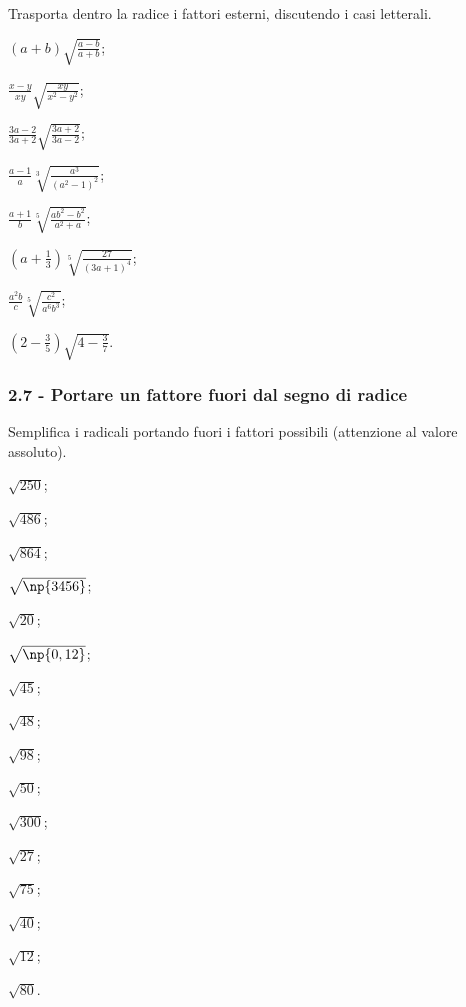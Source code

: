 \begin{esercizio}[\Ast]
 \label{ese:2.51}
Trasporta dentro la radice i fattori esterni, discutendo i casi letterali.
 \begin{multicols}{3}
 \begin{enumeratea}
 \item $(a+b)\sqrt{\frac{a-b}{a+b}}$;
 \item $\frac{x-y}{xy}\sqrt{\frac{xy}{x^2-y^2}}$;
 \item $\frac{3a-2}{3a+2}\sqrt{\frac{3a+2}{3a-2}}$;
 \item $\frac{a-1}{a}\sqrt[3]{\frac{a^3}{(a^2-1)^2}}$;
 \item $\frac{a+1}{b}\sqrt[5]{\frac{ab^2-b^2}{a^2+a}}$;
 \item $\left(a+\frac{1}{3}\right)\sqrt[5]{\frac{27}{(3a+1)^4}}$;
 \item $\frac{a^2b}{c}\sqrt[5]{\frac{c^2}{a^6b^3}}$;
 \item $\left(2-\frac{3}{5}\right)\sqrt{4-\frac{3}{7}}$.
 \end{enumeratea}
 \end{multicols}
\end{esercizio}

\subsubsection*{2.7 - Portare un fattore fuori dal segno di radice}

\begin{esercizio}[\Ast]
 \label{ese:2.52}
Semplifica i radicali portando fuori i fattori possibili (attenzione al valore assoluto).
 \begin{multicols}{4}
 \begin{enumeratea}
 \item $\sqrt{250}$;
 \item $\sqrt{486}$;
 \item $\sqrt{864}$;
 \item $\sqrt{\np{3456}}$;
 \item $\sqrt{20}$;
 \item $\sqrt{\np{0,12}}$;
 \item $\sqrt{45}$;
 \item $\sqrt{48}$;
 \item $\sqrt{98}$;
 \item $\sqrt{50}$;
 \item $\sqrt{300}$;
 \item $\sqrt{27}$;
 \item $\sqrt{75}$;
 \item $\sqrt{40}$;
 \item $\sqrt{12}$;
 \item $\sqrt{80}$.
 \end{enumeratea}
 \end{multicols}
\end{esercizio}

